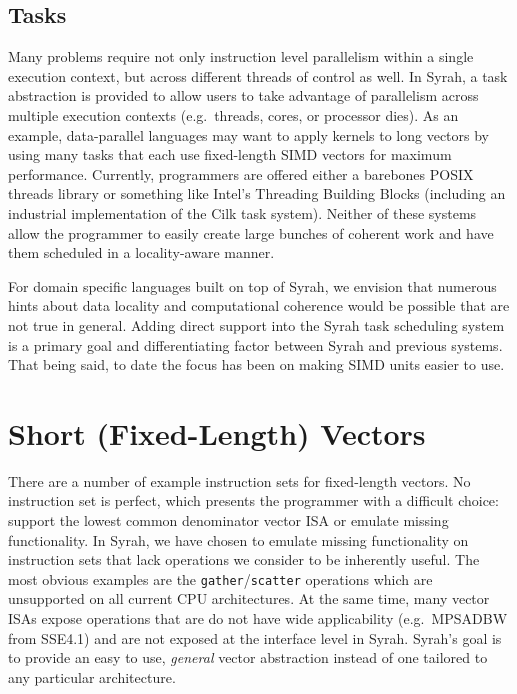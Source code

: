 \documentclass[11pt]{amsart}
\newcommand{\vectorOp}[1]{\texttt{#1}}
\begin{document}
\subsection{Tasks}

Many problems require not only instruction level parallelism within a
single execution context, but across different threads of control as
well. In Syrah, a task abstraction is provided to allow users to take
advantage of parallelism across multiple execution contexts
(e.g.\ threads, cores, or processor dies). As an example,
data-parallel languages may want to apply kernels to long vectors by
using many tasks that each use fixed-length SIMD vectors for maximum
performance. Currently, programmers are offered either a barebones
POSIX threads library or something like Intel's Threading Building
Blocks (including an industrial implementation of the Cilk task
system). Neither of these systems allow the programmer to easily
create large bunches of coherent work and have them scheduled in a
locality-aware manner.

For domain specific languages built on top of Syrah, we envision that
numerous hints about data locality and computational coherence would
be possible that are not true in general. Adding direct support into
the Syrah task scheduling system is a primary goal and differentiating
factor between Syrah and previous systems. That being said, to date
the focus has been on making SIMD units easier to use.

\section{Short (Fixed-Length) Vectors}

There are a number of example instruction sets for fixed-length
vectors. No instruction set is perfect, which presents the programmer
with a difficult choice: support the lowest common denominator vector
ISA or emulate missing functionality. In Syrah, we have chosen to
emulate missing functionality on instruction sets that lack operations
we consider to be inherently useful. The most obvious examples are the
\vectorOp{gather}/\vectorOp{scatter} operations which are unsupported
on all current CPU architectures. At the same time, many vector ISAs
expose operations that are do not have wide applicability
(e.g.\ MPSADBW from SSE4.1) and are not exposed at the interface level
in Syrah. Syrah's goal is to provide an easy to use, \emph{general}
vector abstraction instead of one tailored to any particular
architecture.
\end{document}
